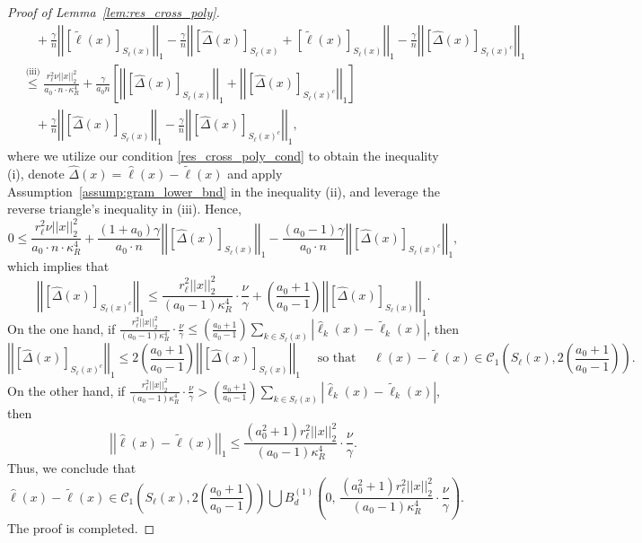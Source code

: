 \documentclass[ejsv2,noshowframe]{imsart}
\theoremstyle{plain}
\theoremstyle{definition}
\theoremstyle{remark}
\newcommand{\norm}[1]{\left|\left| #1 \right|\right|}
\renewcommand{\hat}{\widehat}
\renewcommand{\tilde}{\widetilde}
\begin{document}
\begin{proof}[Proof of Lemma~\ref{lem:res_cross_poly}]
\begin{align*}
		&\quad + \frac{\gamma}{n} \norm{\left[\tilde{\ell}(x)\right]_{S_{\ell}(x)}}_1 - \frac{\gamma}{n}\norm{\left[\hat{\Delta}(x)\right]_{S_{\ell}(x)} + \left[\tilde{\ell}(x)\right]_{S_{\ell}(x)}}_1 - \frac{\gamma}{n} \norm{\left[\hat{\Delta}(x)\right]_{S_{\ell}(x)^c}}_1\\
		&\stackrel{\text{(iii)}}{\leq} \frac{r_{\ell}^2 \nu \norm{x}_2^2}{a_0\cdot n\cdot \kappa_R^4} + \frac{\gamma}{a_0n} \left[\norm{\left[\hat{\Delta}(x)\right]_{S_{\ell}(x)}}_1 + \norm{\left[\hat{\Delta}(x)\right]_{S_{\ell}(x)^c}}_1 \right] \\
		&\quad + \frac{\gamma}{n} \norm{\left[\hat{\Delta}(x)\right]_{S_{\ell}(x)}}_1 - \frac{\gamma}{n} \norm{\left[\hat{\Delta}(x)\right]_{S_{\ell}(x)^c}}_1,
	\end{align*}
	where we utilize our condition \eqref{res_cross_poly_cond} to obtain the inequality (i), denote $\hat{\Delta}(x) = \hat{\ell}(x) -\tilde{\ell}(x)$ and apply Assumption~\ref{assump:gram_lower_bnd} in the inequality (ii), and leverage the reverse triangle's inequality in (iii). Hence,
	$$0\leq \frac{r_{\ell}^2 \nu \norm{x}_2^2}{a_0\cdot n\cdot \kappa_R^4} + \frac{(1+a_0)\gamma}{a_0 \cdot n} \norm{\left[\hat{\Delta}(x)\right]_{S_{\ell}(x)}}_1 - \frac{(a_0-1) \gamma}{a_0 \cdot n} \norm{\left[\hat{\Delta}(x)\right]_{S_{\ell}(x)^c}}_1,$$
	which implies that
	$$\norm{\left[\hat{\Delta}(x)\right]_{S_{\ell}(x)^c}}_1 \leq \frac{r_{\ell}^2 \norm{x}_2^2}{(a_0-1) \kappa_R^4}\cdot \frac{\nu}{\gamma} + \left(\frac{a_0+1}{a_0-1}\right) \norm{\left[\hat{\Delta}(x)\right]_{S_{\ell}(x)}}_1.$$
	On the one hand, if $\frac{r_{\ell}^2 \norm{x}_2^2}{(a_0-1) \kappa_R^4}\cdot \frac{\nu}{\gamma} \leq \left(\frac{a_0+1}{a_0-1}\right) \sum_{k\in S_{\ell}(x)} \left|\hat{\ell}_k(x) -\tilde{\ell}_k(x) \right|$, then
	$$\norm{\left[\hat{\Delta}(x)\right]_{S_{\ell}(x)^c}}_1 \leq 2\left(\frac{a_0+1}{a_0-1}\right) \norm{\left[\hat{\Delta}(x)\right]_{S_{\ell}(x)}}_1 \quad \text{ so that }\quad \hat{\ell}(x)-\tilde{\ell}(x) \in \mathcal{C}_1\left(S_{\ell}(x), 2\left(\frac{a_0+1}{a_0-1}\right)\right).$$
	On the other hand, if $\frac{r_{\ell}^2 \norm{x}_2^2}{(a_0-1) \kappa_R^4}\cdot \frac{\nu}{\gamma} > \left(\frac{a_0+1}{a_0-1}\right) \sum_{k\in S_{\ell}(x)} \left|\hat{\ell}_k(x) -\tilde{\ell}_k(x) \right|$, then
	$$\norm{\hat{\ell}(x) - \tilde{\ell}(x)}_1 \leq \frac{(a_0^2+1)r_{\ell}^2 \norm{x}_2^2}{(a_0-1) \kappa_R^4} \cdot \frac{\nu}{\gamma}.$$
	Thus, we conclude that
	$$\hat{\ell}(x)-\tilde{\ell}(x) \in \mathcal{C}_1\left(S_{\ell}(x), 2\left(\frac{a_0+1}{a_0-1}\right) \right) \bigcup B_d^{(1)}\left(0,\, \frac{(a_0^2+1)r_{\ell}^2 \norm{x}_2^2}{(a_0-1) \kappa_R^4} \cdot \frac{\nu}{\gamma}\right).$$
	The proof is completed.
\end{proof}
\end{document}
